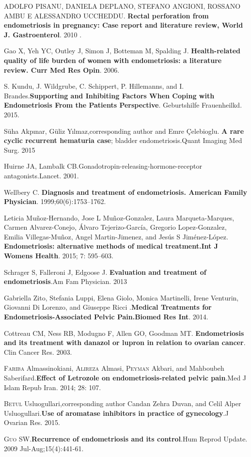 \documentclass[12pt]{article} %
\begin{document}
ADOLFO PISANU, DANIELA DEPLANO, STEFANO ANGIONI, ROSSANO AMBU E ALESSANDRO UCCHEDDU. \textbf{Rectal perforation from endometriosis in pregnancy: Case report and literature review, World J. Gastroenterol}. 2010 .

Gao X, Yeh YC, Outley J, Simon J, Botteman M, Spalding J. \textbf{Health-related quality of life burden of women with endometriosis: a literature review. Curr Med Res Opin}. 2006.

S. Kundu, J. Wildgrube, C. Schippert, P. Hillemanns, and I. Brandes.\textbf{Supporting and Inhibiting Factors When Coping with Endometriosis From the Patients Perspective}. Geburtshilfe Frauenheilkd. 2015.

Süha Akpınar, Güliz Yılmaz,corresponding author and Emre Çelebioglu.\textbf{ A rare cyclic recurrent hematuria case}; bladder endometriosis.Quant Imaging Med Surg. 2015 

Huirne JA, Lambalk CB.Gonadotropin-releasing-hormone-receptor antagonists.Lancet. 2001.

Wellbery C.\textbf{ Diagnosis and treatment of endometriosis. American Family Physician}. 1999;60(6):1753–1762.

Leticia Muñoz-Hernando, Jose L Muñoz-Gonzalez, Laura Marqueta-Marques, Carmen Alvarez-Conejo, Álvaro Tejerizo-García, Gregorio Lopez-Gonzalez, Emilia Villegas-Muñoz, Angel Martin-Jimenez, and Jesús S Jiménez-López. \textbf{Endometriosis: alternative methods of medical treatment.Int J Womens Health}. 2015; 7: 595–603. 

Schrager S, Falleroni J, Edgoose J.\textbf{ Evaluation and treatment of endometriosis}.Am Fam Physician. 2013

Gabriella Zito, Stefania Luppi, Elena Giolo, Monica Martinelli, Irene Venturin, Giovanni Di Lorenzo, and Giuseppe Ricci .\textbf{Medical Treatments for Endometriosis-Associated Pelvic Pain.Biomed Res Int}. 2014.

Cottreau CM, Ness RB, Modugno F, Allen GO, Goodman MT. \textbf{Endometriosis and its treatment with danazol or lupron in relation to ovarian cancer}. Clin Cancer Res. 2003.

\textsc{Fariba} Almassinokiani, \textsc{Alireza} Almasi, \textsc{Peyman} Akbari, and Mahboubeh Saberifard.\textbf{Effect of Letrozole on endometriosis-related pelvic pain}.Med J Islam Repub Iran. 2014; 28: 107. 

\textsc{Betul} Usluogullari,corresponding author Candan Zehra Duvan, and Celil Alper Usluogullari.\textbf{Use of aromatase inhibitors in practice of gynecology}.J Ovarian Res. 2015.

\textsc{Guo} SW.\textbf{Recurrence of endometriosis and its control}.Hum Reprod Update. 2009 Jul-Aug;15(4):441-61.
\end{document}
